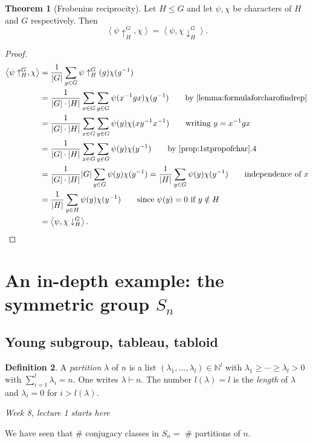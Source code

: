 \documentclass{article}
\newcommand{\la}{\left\langle}
\newcommand{\ra}{\right\rangle}
\newcommand{\N}{\mathbb{N}}
\theoremstyle{definition}
\newtheorem{defn}{Definition}[subsection]
\newtheorem{thm}[defn]{Theorem}
\begin{document}
\begin{thm}[Frobenius reciprocity]
Let $H\leq G$ and let $\psi,\chi$ be characters of $H$ and $G$ respectively. Then
\[
\la\psi\uparrow_H^G,\chi\ra=\la\psi,\chi\downarrow_H^G\ra.
\]
\end{thm}
\begin{proof}
\[
\begin{aligned}
\la\psi\uparrow_H^G,\chi\ra&=\frac{1}{|G|}\sum_{g\in G}\psi\uparrow_H^G(g)\chi(g^{-1}) \\
&=\frac{1}{|G|\cdot|H|}\sum_{x\in G}\sum_{g\in G}\psi(x^{-1}gx)\chi(g^{-1}) \qquad \text{by \ref{lemma:formulaforcharofindrep}}\\
&=\frac{1}{|G|\cdot|H|}\sum_{x\in G}\sum_{y\in G} \psi(y)\chi(xy^{-1}x^{-1})\qquad\text{writing }y=x^{-1}gx\\
&=\frac{1}{|G|\cdot|H|}\sum_{x\in G}\sum_{y\in G} \psi(y)\chi(y^{-1})\qquad\text{by \ref{prop:1stpropofchar}.4}\\
&=\frac{1}{|G|\cdot|H|}|G|\sum_{y\in G}\psi(y)\chi(y^{-1})=\frac{1}{|H|}\sum_{y\in G}\psi(y)\chi(y^{-1}) \qquad\text{independence of }x\\
&=\frac{1}{|H|}\sum_{y\in H}\psi(y)\chi(y^{-1}) \qquad\text{since }\psi(y)=0\text{ if } y\notin H\\
&=\la\psi,\chi\downarrow_H^G\ra.
\end{aligned}
\]
\end{proof}

\section{An in-depth example: the symmetric group $S_n$}
\subsection{Young subgroup, tableau, tabloid}
\begin{defn}
A \textit{partition} $\lambda$ of $n$ is a list $(\lambda_1,\ldots,\lambda_l)\in\N^l$ with $\lambda_1\geq\cdots\geq\lambda_l>0$ with $\sum_{i=1}^l \lambda_i=n$. One writes $\lambda\vdash n$. The number $l(\lambda)=l$ is the \textit{length} of $\lambda$ and $\lambda_i=0$ for $i>l(\lambda)$.
\end{defn}

\begin{flushright}
\textit{Week 8, lecture 1 starts here}
\end{flushright}

We have seen that \# conjugacy classes in $S_n=$ \# partitions of $n$.
\end{document}
